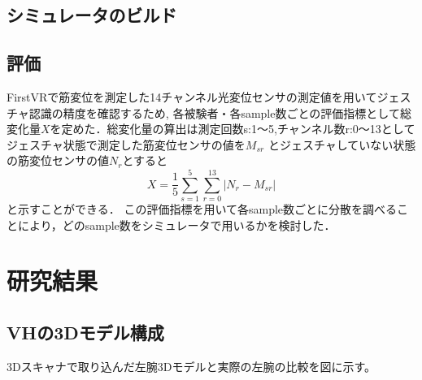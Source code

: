 \documentclass{ltjsreport}
\begin{document}
	\section{シミュレータのビルド}
	\section{評価}
		FirstVRで筋変位を測定した14チャンネル光変位センサの測定値を用いてジェスチャ認識の精度を確認するため,
		各被験者・各sample数ごとの評価指標として総変化量$X$を定めた．総変化量の算出は測定回数s:1～5,チャンネル数r:0～13としてジェスチャ状態で測定した筋変位センサの値を$M_{{s}{r}}$
		とジェスチャしていない状態の筋変位センサの値$N_{r}$とすると
		\begin{equation}
			X = \frac{1}{5} \sum_{s = 1}^{5} \sum_{r = 0}^{13} |N_{r} - M_{{s}{r}}|
		\end{equation}
		と示すことができる．
		この評価指標を用いて各sample数ごとに分散を調べることにより，どのsample数をシミュレータで用いるかを検討した．
		
\chapter{研究結果}
	
	\section{VHの3Dモデル構成}
		3Dスキャナで取り込んだ左腕3Dモデルと実際の左腕の比較を図に示す。
\end{document}
